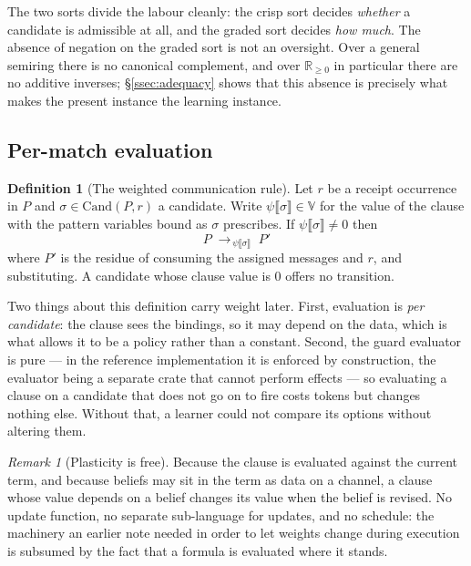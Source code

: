 \documentclass[11pt,a4paper]{article}
\theoremstyle{plain}
\theoremstyle{definition}
\newtheorem{definition}[theorem]{Definition}
\theoremstyle{remark}
\newtheorem{remark}[theorem]{Remark}
\newcommand{\V}{\mathbb{V}}
\newcommand{\Rnn}{\mathbb{R}_{\geq 0}}
\newcommand{\Cand}{\mathrm{Cand}}
\begin{document}
The two sorts divide the labour cleanly: the crisp sort decides \emph{whether} a
candidate is admissible at all, and the graded sort decides \emph{how much}. The
absence of negation on the graded sort is not an oversight. Over a general
semiring there is no canonical complement, and over $\Rnn$ in particular there
are no additive inverses; \S\ref{ssec:adequacy} shows that this absence is
precisely what makes the present instance the learning instance.

\subsection{Per-match evaluation}\label{ssec:permatch}

\begin{definition}[The weighted communication rule]\label{def:comm}
Let $r$ be a receipt occurrence in $P$ and $\sigma \in \Cand(P,r)$ a candidate.
Write $\psi\llbracket \sigma \rrbracket \in \V$ for the value of the clause with
the pattern variables bound as $\sigma$ prescribes. If
$\psi\llbracket\sigma\rrbracket \neq 0$ then
\[
P \;\longrightarrow_{\,\psi\llbracket\sigma\rrbracket}\; P'
\]
where $P'$ is the residue of consuming the assigned messages and $r$, and
substituting. A candidate whose clause value is $0$ offers no transition.
\end{definition}

Two things about this definition carry weight later. First, evaluation is
\emph{per candidate}: the clause sees the bindings, so it may depend on the data,
which is what allows it to be a policy rather than a constant. Second, the guard
evaluator is pure --- in the reference implementation it is enforced by
construction, the evaluator being a separate crate that cannot perform effects ---
so evaluating a clause on a candidate that does not go on to fire costs tokens
but changes nothing else. Without that, a learner could not compare its options
without altering them.

\begin{remark}[Plasticity is free]\label{rem:plastic}
Because the clause is evaluated against the current term, and because beliefs may
sit in the term as data on a channel, a clause whose value depends on a belief
changes its value when the belief is revised. No update function, no separate
sub-language for updates, and no schedule: the machinery an earlier note needed
in order to let weights change during execution is subsumed by the fact that a
formula is evaluated where it stands.
\end{remark}
\end{document}
